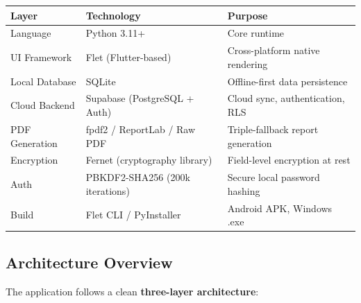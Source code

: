 \documentclass[11pt,a4paper]{article}
\begin{document}
\begin{table}[H]
\centering
\renewcommand{\arraystretch}{1.3}
\begin{tabularx}{\textwidth}{l l X}
\toprule
\textbf{Layer} & \textbf{Technology} & \textbf{Purpose} \\
\midrule
Language         & Python 3.11+                          & Core runtime \\
UI Framework     & Flet (Flutter-based)                  & Cross-platform native rendering \\
Local Database   & SQLite                                & Offline-first data persistence \\
Cloud Backend    & Supabase (PostgreSQL + Auth)           & Cloud sync, authentication, RLS \\
PDF Generation   & fpdf2 / ReportLab / Raw PDF            & Triple-fallback report generation \\
Encryption       & Fernet (cryptography library)          & Field-level encryption at rest \\
Auth             & PBKDF2-SHA256 (200k iterations)        & Secure local password hashing \\
Build            & Flet CLI / PyInstaller                 & Android APK, Windows .exe \\
\bottomrule
\end{tabularx}
\end{table}

\subsection{Architecture Overview}

The application follows a clean \textbf{three-layer architecture}:
\end{document}
